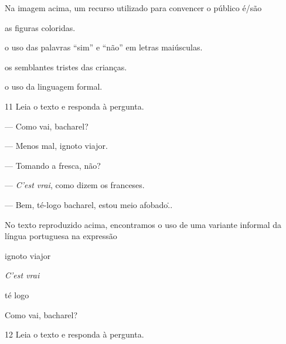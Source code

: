 
Na imagem acima, um recurso utilizado para convencer o público é/são

\begin{escolha}
  \item as figuras coloridas.

  \item o uso das palavras ``sim'' e ``não'' em letras maiúsculas.

  \item os semblantes tristes das crianças.

  \item o uso da linguagem formal.
\end{escolha}

\num{11} Leia o texto e responda à pergunta.

\begin{myquote}
--- Como vai, bacharel?

--- Menos mal, ignoto viajor.

--- Tomando a fresca, não?

--- \textit{C'est vrai}, como dizem os franceses.

--- Bem, té-logo bacharel, estou meio afobado\...

\end{myquote}

No texto reproduzido acima, encontramos o uso de uma variante informal
da língua portuguesa na expressão

\begin{multicols}{2}
\begin{escolha}
  \item ignoto viajor 

  \item \textit{C'est vrai}

  \item té logo

  \item Como vai, bacharel?
\end{escolha}
\end{multicols}

\num{12} Leia o texto e responda à pergunta.

